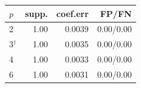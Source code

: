 \begin{tabular}{lrrr}\toprule
$p$ & supp. & coef.err & FP/FN \\\midrule
2 & 1.00 & 0.0039 & 0.00/0.00 \\
3$^\dagger$ & 1.00 & 0.0035 & 0.00/0.00 \\
4 & 1.00 & 0.0033 & 0.00/0.00 \\
6 & 1.00 & 0.0031 & 0.00/0.00 \\
\bottomrule\end{tabular}
